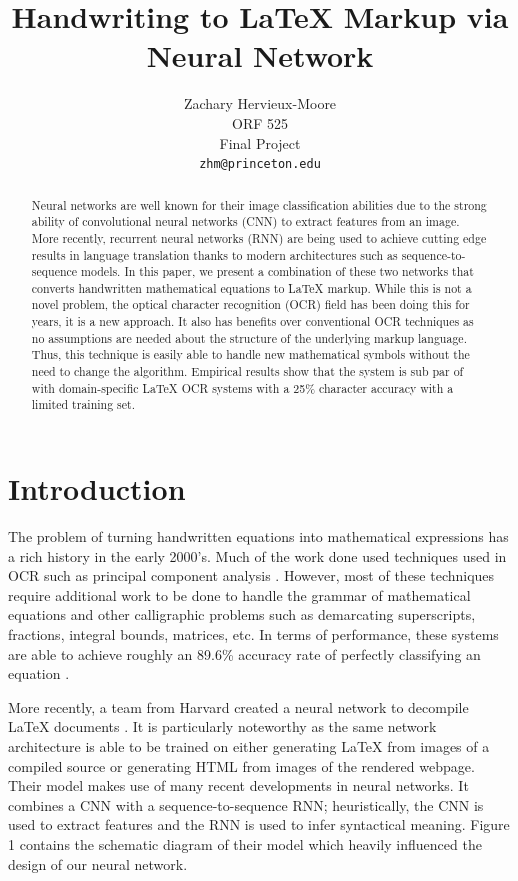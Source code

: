 \documentclass{article}
\title{Handwriting to \LaTeX{} Markup via Neural Network}
\author{
  Zachary Hervieux-Moore \\
  ORF 525\\
  Final Project\\
  \texttt{zhm@princeton.edu} \\
}
\begin{document}
\maketitle

\begin{abstract}
  Neural networks are well known for their image classification abilities due to
  the strong ability of convolutional neural networks (CNN) to extract features
  from an image. More recently, recurrent neural networks (RNN) are being used
  to achieve cutting edge results in language translation thanks to modern
  architectures such as sequence-to-sequence models. In this paper, we present
  a combination of these two networks that converts handwritten mathematical
  equations to \LaTeX{} markup. While this is not a novel problem, the optical
  character recognition (OCR) field has been doing this for years, it is a new
  approach. It also has benefits over conventional OCR techniques as no
  assumptions are needed about the structure of the underlying markup language.
  Thus, this technique is easily able to handle new mathematical symbols without
  the need to change the algorithm. Empirical results show that the system is
  sub par of with domain-specific \LaTeX{} OCR systems with a 25\% character
  accuracy with a limited training set.
\end{abstract}

\section{Introduction}

The problem of turning handwritten equations into mathematical expressions has a
rich history in the early 2000's. Much of the work done used techniques used
in OCR such as principal component analysis \cite{kumar_2013}. However, most of
these techniques require additional work to be done to handle the grammar of
mathematical equations and other calligraphic problems such as demarcating
superscripts, fractions, integral bounds, matrices, etc. In terms of performance,
these systems are able to achieve roughly an 89.6\% accuracy rate
of perfectly classifying an equation \cite{suzuki_tamari_fukuda_uchida_kanahori_2003}.

More recently, a team from Harvard created a neural network to decompile \LaTeX{}
documents \cite{1609.04938}. It is particularly noteworthy as the same network
architecture is able to be trained on either generating \LaTeX{} from images
of a compiled source or generating HTML from images of the rendered webpage.
Their model makes use of many recent developments in neural networks. It combines
a CNN with a sequence-to-sequence RNN; heuristically, the CNN is used to extract
features and the RNN is used to infer syntactical meaning. Figure 1 contains
the schematic diagram of their model which heavily influenced the design of our
neural network.
\end{document}
